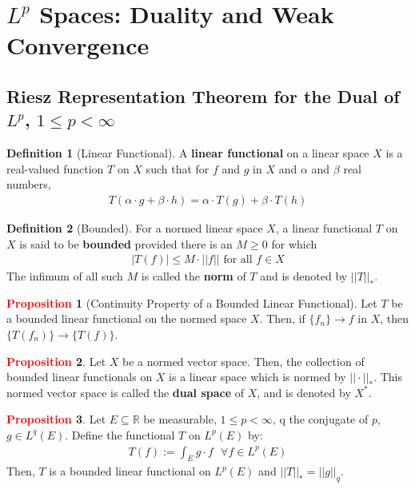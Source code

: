\documentclass[11pt]{article}
\theoremstyle{definition}
\theoremstyle{definition}
\newcommand{\R}[0]{\mathbb{R}}
\theoremstyle{definition}
\newtheorem{definition}{\textcolor{OliveGreen}{Definition}}
\newtheorem{prop}{\textcolor{red}{Proposition}}
\theoremstyle{remark}
\begin{document}
\section{$L^p$ Spaces: Duality and Weak Convergence}

\subsection{Riesz Representation Theorem for the Dual of $L^p$, $1 \leq p < \infty$}
\begin{definition}[Linear Functional]
	A \textbf{linear functional} on a linear space $X$ is a real-valued function $T$ on $X$ such that for $f$ and $g$ in $X$ and $\alpha$ and $\beta$ real numbers, 
	\begin{align}
		T(\alpha \cdot g + \beta \cdot h ) = \alpha \cdot T(g) + \beta \cdot T(h) 
	\end{align}
\end{definition}

\begin{definition}[Bounded]
	For a normed linear space $X$, a linear functional $T$ on $X$ is said to be \textbf{bounded} provided there is an $M \geq 0$ for which 
	\begin{align}
		|T(f)| \leq M \cdot ||f|| \text{ for all } f \in X
	\end{align}
	The infimum of all such $M$ is called the \textbf{norm} of $T$ and is denoted by $||T||_*$. 
\end{definition}

\begin{prop}[Continuity Property of a Bounded Linear Functional] 
	Let $T$ be a bounded linear functional on the normed space $X$. Then, if $\{ f_n \} \rightarrow f$ in $X$, then $\{ T(f_n) \} \rightarrow \{ T(f) \} $. 
\end{prop}

\begin{prop}
	Let $X$ be a normed vector space. Then, the collection of bounded linear functionals on $X$ is a linear space which is normed by $|| \cdot ||_*$. This normed vector space is called the \textbf{dual space} of $X$, and is denoted by $X^*$. 
\end{prop}

\begin{prop}
	Let $E \subseteq \R$ be measurable, $1 \leq p < \infty$, q the conjugate of $p$, $g \in L^q(E)$. Define the functional $T$ on $L^p(E)$ by: 
	\begin{align}
		T(f) := \int_E g \cdot f \text{ 		} \forall f \in L^p(E) 
	\end{align}
	Then, $T$ is a bounded linear functional on $L^p(E)$ and $||T||_* = ||g||_q$. 
\end{prop}
\end{document}
